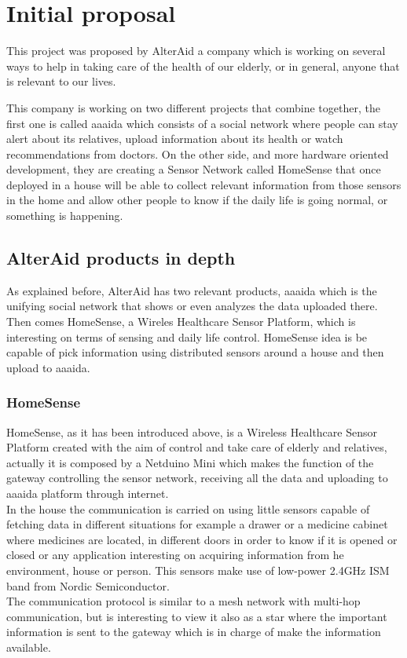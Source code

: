 \chapter{Initial proposal}\label{C:innitial-proposal}
This project was proposed by AlterAid a company which is working on several ways to help in taking care of the health of our elderly, or in general, anyone that is relevant to our lives.

This company is working on two different projects that combine together, the first one is called aaaida which consists of a social network where people can stay alert about its relatives, upload information about its health or watch recommendations from doctors. On the other side, and more hardware oriented development, they are creating a Sensor Network called HomeSense that once deployed in a house will be able to collect relevant information from those sensors in the home and allow other people to know if the daily life is going normal, or something is happening.


\section{AlterAid products in depth}\label{S:alteraid-products}
As explained before, AlterAid has two relevant products, aaaida which is the unifying social network that shows or even analyzes
the data uploaded there. Then comes HomeSense, a Wireles Healthcare Sensor Platform, which is interesting on terms of sensing and daily life control. HomeSense idea is be capable of pick information using distributed sensors around a house and then upload to aaaida.

\subsection{HomeSense}\label{SS:HomeSense-proposal}
HomeSense, as it has been introduced above, is a Wireless Healthcare Sensor Platform created with the aim of control and take care of elderly and relatives, actually it is composed by a Netduino Mini which makes the function of the gateway controlling the sensor network, receiving all the data and uploading to aaaida platform through internet.
\\
In the house the communication is carried on using little sensors capable of fetching data in different situations for example a drawer or a medicine cabinet where medicines are located, in different doors in order to know if it is opened or closed or any application interesting on acquiring information from he environment, house or person. This sensors make use of low-power 2.4GHz ISM band from Nordic Semiconductor.
\\
The communication protocol is similar to a mesh network with multi-hop communication, but is interesting to view it also as a star where the important information is sent to the gateway which is in charge of make the information available.

